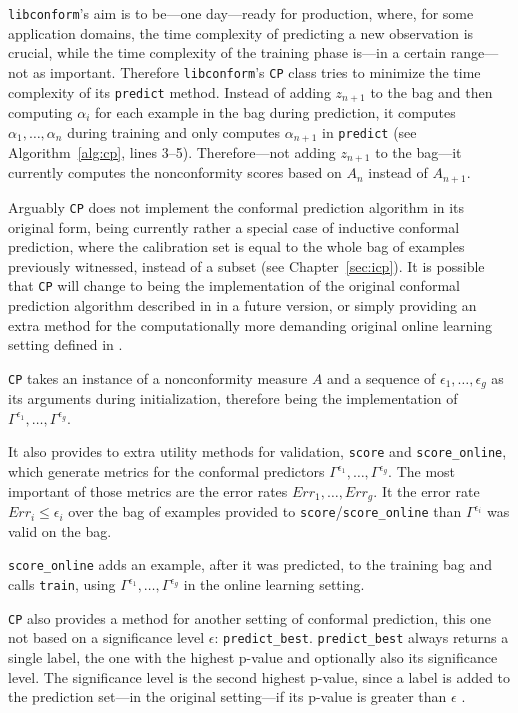 \documentclass[twoside,11pt]{article}
\def\libconform{\texttt{libconform}}
\begin{document}
\libconform{}'s aim is to be---one day---ready for
production, where, for some application domains, the time
complexity of predicting a new observation is crucial,
while the time complexity of the training phase
is---in a certain range---not as important.
Therefore \libconform{}'s \texttt{CP} class tries to
minimize the time complexity of its \texttt{predict}
method. Instead of adding $z_{n+1}$ to the bag and then
computing $\alpha_i$ for each example in the bag during
prediction, it computes $\alpha_1,\dots,\alpha_n$ during
training and only computes $\alpha_{n+1}$ in
\texttt{predict} (see Algorithm~\ref{alg:cp}, lines 3--5).
Therefore---not adding $z_{n+1}$ to the bag---it
currently computes the nonconformity scores based on
$A_n$ instead of $A_{n+1}$.

Arguably \texttt{CP} does not implement the conformal
prediction algorithm in its original form, being currently
rather a special case of inductive conformal prediction,
where the calibration set is equal to the whole bag of
examples previously witnessed, instead of a subset (see
Chapter~\ref{sec:icp}).
It is possible that \texttt{CP} will change to being the
implementation of the original conformal prediction
algorithm described in \citet[][Chapter 2]{alrw} in a
future version, or simply providing an extra method for the
computationally more demanding original online learning
setting defined in \citet[][Chapter 2]{alrw}.

\texttt{CP} takes an instance of a nonconformity measure
$A$ and a sequence of $\epsilon_1,\dots,\epsilon_{g}$
as its arguments during initialization, therefore being the
implementation of
$\Gamma^{\epsilon_1},\dots,\Gamma^{\epsilon_g}$.

It also provides to extra utility methods for validation,
\texttt{score} and \texttt{score\_online}, which generate
metrics for the conformal predictors
$\Gamma^{\epsilon_1},\dots,\Gamma^{\epsilon_g}$.
The most important of those metrics are the error rates
$Err_1,\dots,Err_{g}$.
It the error rate $Err_i \leq \epsilon_i$ over the bag of
examples provided to \texttt{score}/\texttt{score\_online}
than $\Gamma^{\epsilon_i}$ was valid on the bag.

\texttt{score\_online} adds an example, after it was
predicted, to the training bag and calls \texttt{train},
using $\Gamma^{\epsilon_1},\dots,\Gamma^{\epsilon_g}$ in
the online learning setting.

\texttt{CP} also provides a method for another setting of
conformal prediction, this one not based on a significance
level $\epsilon$: \texttt{predict\_best}.
\texttt{predict\_best} always returns a single label, the
one with the highest p-value and optionally also its
significance level. The significance level is the second
highest p-value, since a label is added to the prediction
set---in the original setting---if its p-value is greater
than $\epsilon$ \citep[see][]{papadopoulos_et_al_2007}.
\end{document}

